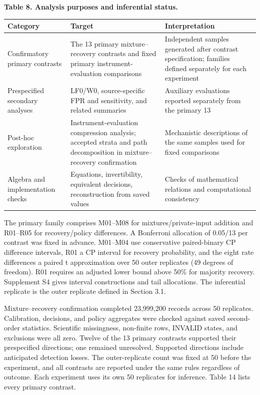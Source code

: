 \documentclass[10pt,a4paper]{article}
\newlength{\usable}
\begin{document}
\begin{table}[H]\fontsize{9.3}{12}\selectfont
\setlength{\usable}{\dimexpr\linewidth-4\tabcolsep\relax}
{\raggedright \textbf{Table 8. Analysis purposes and inferential status.}\par}\vspace{3pt}
\noindent\begin{tabular}{@{}>{\raggedright\arraybackslash}p{0.21\usable}>{\raggedright\arraybackslash}p{0.34\usable}>{\raggedright\arraybackslash}p{0.45\usable}@{}}
\toprule
\bfseries Category & \bfseries Target & \bfseries Interpretation \\
\midrule
Confirmatory primary contrasts & The 13 primary mixture–recovery contrasts and fixed primary instrument-evaluation comparisons & Independent samples generated after contrast specification; families defined separately for each experiment \\
Prespecified secondary analyses & LF0/W0, source-specific FPR and sensitivity, and related summaries & Auxiliary evaluations reported separately from the primary 13 \\
Post-hoc exploration & Instrument-evaluation compression analysis; accepted strata and path decomposition in mixture–recovery confirmation & Mechanistic descriptions of the same samples used for fixed comparisons \\
Algebra and implementation checks & Equations, invertibility, equivalent decisions, reconstruction from saved values & Checks of mathematical relations and computational consistency \\
\bottomrule\end{tabular}\end{table}

The primary family comprises M01–M08 for mixtures/private-input addition and R01–R05 for recovery/policy differences. A Bonferroni allocation of 0.05/13 per contrast was fixed in advance. M01–M04 use conservative paired-binary CP difference intervals, R01 a CP interval for recovery probability, and the eight rate differences a paired t approximation over 50 outer replicates (49 degrees of freedom). R01 requires an adjusted lower bound above 50\% for majority recovery. Supplement S4 gives interval constructions and tail allocations. The inferential replicate is the outer replicate defined in Section 3.1.

Mixture–recovery confirmation completed 23,999,200 records across 50 replicates. Calibration, decisions, and policy aggregates were checked against saved second-order statistics. Scientific missingness, non-finite rows, INVALID states, and exclusions were all zero. Twelve of the 13 primary contrasts supported their prespecified directions; one remained unresolved. Supported directions include anticipated detection losses. The outer-replicate count was fixed at 50 before the experiment, and all contrasts are reported under the same rules regardless of outcome. Each experiment uses its own 50 replicates for inference. Table 14 lists every primary contrast.
\end{document}
